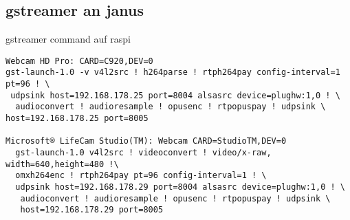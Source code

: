 \subsection{gstreamer an janus}
gstreamer command auf raspi
\begin{verbatim}
Webcam HD Pro: CARD=C920,DEV=0
gst-launch-1.0 -v v4l2src ! h264parse ! rtph264pay config-interval=1 pt=96 ! \
 udpsink host=192.168.178.25 port=8004 alsasrc device=plughw:1,0 ! \ 
  audioconvert ! audioresample ! opusenc ! rtpopuspay ! udpsink \  host=192.168.178.25 port=8005
  
Microsoft® LifeCam Studio(TM): Webcam CARD=StudioTM,DEV=0
  gst-launch-1.0 v4l2src ! videoconvert ! video/x-raw, width=640,height=480 !\
  omxh264enc ! rtph264pay pt=96 config-interval=1 ! \ 
  udpsink host=192.168.178.29 port=8004 alsasrc device=plughw:1,0 ! \
   audioconvert ! audioresample ! opusenc ! rtpopuspay ! udpsink \
   host=192.168.178.29 port=8005 
\end{verbatim}

